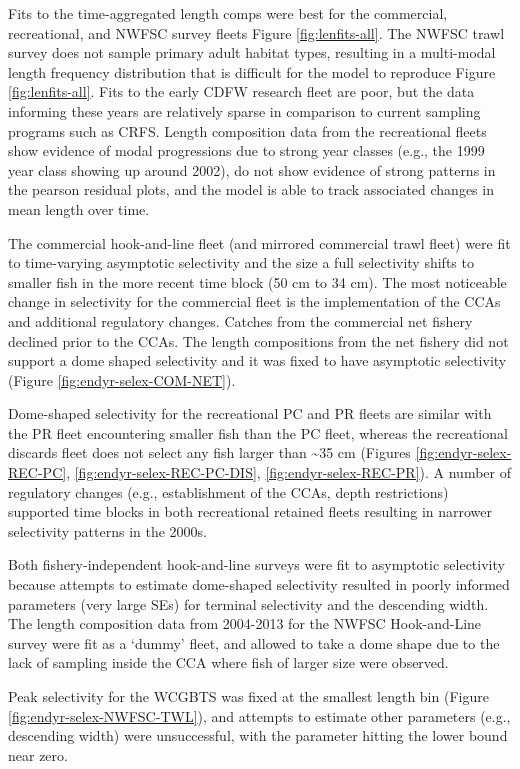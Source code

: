 \documentclass[
  english,
  a4paper,
]{article}
\begin{document}
Fits to the time-aggregated length comps were best for the commercial, recreational, and NWFSC survey fleets Figure \ref{fig:lenfits-all}. The NWFSC trawl survey does not sample primary adult habitat types, resulting in a multi-modal length frequency distribution that is difficult for the model to reproduce Figure \ref{fig:lenfits-all}. Fits to the early CDFW research fleet are poor, but the data informing these years are relatively sparse in comparison to current sampling programs such as CRFS. Length composition data from the recreational fleets show evidence of modal progressions due to strong year classes (e.g., the 1999 year class showing up around 2002), do not show evidence of strong patterns in the pearson residual plots, and the model is able to track associated changes in mean length over time.

The commercial hook-and-line fleet (and mirrored commercial trawl fleet) were fit to time-varying asymptotic selectivity and the size a full selectivity shifts to smaller fish in the more recent time block (50 cm to 34 cm). The most noticeable change in selectivity for the commercial fleet is the implementation of the CCAs and additional regulatory changes. Catches from the commercial net fishery declined prior to the CCAs. The length compositions from the net fishery did not support a dome shaped selectivity and it was fixed to have asymptotic selectivity (Figure \ref{fig:endyr-selex-COM-NET}).

Dome-shaped selectivity for the recreational PC and PR fleets are similar with the PR fleet encountering smaller fish than the PC fleet, whereas the recreational discards fleet does not select any fish larger than \textasciitilde35 cm (Figures \ref{fig:endyr-selex-REC-PC}, \ref{fig:endyr-selex-REC-PC-DIS}, \ref{fig:endyr-selex-REC-PR}). A number of regulatory changes (e.g., establishment of the CCAs, depth restrictions) supported time blocks in both recreational retained fleets resulting in narrower selectivity patterns in the 2000s.

Both fishery-independent hook-and-line surveys were fit to asymptotic selectivity because attempts to estimate dome-shaped selectivity resulted in poorly informed parameters (very large SEs) for terminal selectivity and the descending width. The length composition data from 2004-2013 for the NWFSC Hook-and-Line survey were fit as a `dummy' fleet, and allowed to take a dome shape due to the lack of sampling inside the CCA where fish of larger size were observed.

Peak selectivity for the WCGBTS was fixed at the smallest length bin (Figure \ref{fig:endyr-selex-NWFSC-TWL}), and attempts to estimate other parameters (e.g., descending width) were unsuccessful, with the parameter hitting the lower bound near zero.
\end{document}
